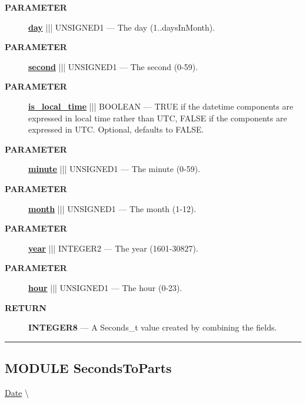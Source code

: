 \par
\begin{description}
\item [\colorbox{tagtype}{\color{white} \textbf{\textsf{PARAMETER}}}] \textbf{\underline{day}} ||| UNSIGNED1 --- The day (1..daysInMonth).
\item [\colorbox{tagtype}{\color{white} \textbf{\textsf{PARAMETER}}}] \textbf{\underline{second}} ||| UNSIGNED1 --- The second (0-59).
\item [\colorbox{tagtype}{\color{white} \textbf{\textsf{PARAMETER}}}] \textbf{\underline{is\_local\_time}} ||| BOOLEAN --- TRUE if the datetime components are expressed in local time rather than UTC, FALSE if the components are expressed in UTC. Optional, defaults to FALSE.
\item [\colorbox{tagtype}{\color{white} \textbf{\textsf{PARAMETER}}}] \textbf{\underline{minute}} ||| UNSIGNED1 --- The minute (0-59).
\item [\colorbox{tagtype}{\color{white} \textbf{\textsf{PARAMETER}}}] \textbf{\underline{month}} ||| UNSIGNED1 --- The month (1-12).
\item [\colorbox{tagtype}{\color{white} \textbf{\textsf{PARAMETER}}}] \textbf{\underline{year}} ||| INTEGER2 --- The year (1601-30827).
\item [\colorbox{tagtype}{\color{white} \textbf{\textsf{PARAMETER}}}] \textbf{\underline{hour}} ||| UNSIGNED1 --- The hour (0-23).
\end{description}







\par
\begin{description}
\item [\colorbox{tagtype}{\color{white} \textbf{\textsf{RETURN}}}] \textbf{INTEGER8} --- A Seconds\_t value created by combining the fields.
\end{description}




\rule{\linewidth}{0.5pt}
\subsection*{\textsf{\colorbox{headtoc}{\color{white} MODULE}
SecondsToParts}}

\hypertarget{ecldoc:date.secondstoparts}{}
\hspace{0pt} \hyperlink{ecldoc:Date}{Date} \textbackslash 

